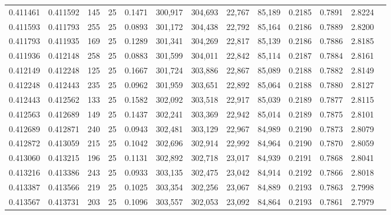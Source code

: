 \begin{tabular}{rrrrrrrrrrrrr}
0.411461 & 0.411592 &   145 &  25 &                                     0.1471 & 300,917 & 304,693 &  22,767 &  85,189 & 0.2185 & 0.7891 & 2.8224 \\
0.411593 & 0.411793 &   255 &  25 &                                     0.0893 & 301,172 & 304,438 &  22,792 &  85,164 & 0.2186 & 0.7889 & 2.8200 \\
0.411793 & 0.411935 &   169 &  25 &                                     0.1289 & 301,341 & 304,269 &  22,817 &  85,139 & 0.2186 & 0.7886 & 2.8185 \\
0.411936 & 0.412148 &   258 &  25 &                                     0.0883 & 301,599 & 304,011 &  22,842 &  85,114 & 0.2187 & 0.7884 & 2.8161 \\
0.412149 & 0.412248 &   125 &  25 &                                     0.1667 & 301,724 & 303,886 &  22,867 &  85,089 & 0.2188 & 0.7882 & 2.8149 \\
0.412248 & 0.412443 &   235 &  25 &                                     0.0962 & 301,959 & 303,651 &  22,892 &  85,064 & 0.2188 & 0.7880 & 2.8127 \\
0.412443 & 0.412562 &   133 &  25 &                                     0.1582 & 302,092 & 303,518 &  22,917 &  85,039 & 0.2189 & 0.7877 & 2.8115 \\
0.412563 & 0.412689 &   149 &  25 &                                     0.1437 & 302,241 & 303,369 &  22,942 &  85,014 & 0.2189 & 0.7875 & 2.8101 \\
0.412689 & 0.412871 &   240 &  25 &                                     0.0943 & 302,481 & 303,129 &  22,967 &  84,989 & 0.2190 & 0.7873 & 2.8079 \\
0.412872 & 0.413059 &   215 &  25 &                                     0.1042 & 302,696 & 302,914 &  22,992 &  84,964 & 0.2190 & 0.7870 & 2.8059 \\
0.413060 & 0.413215 &   196 &  25 &                                     0.1131 & 302,892 & 302,718 &  23,017 &  84,939 & 0.2191 & 0.7868 & 2.8041 \\
0.413216 & 0.413386 &   243 &  25 &                                     0.0933 & 303,135 & 302,475 &  23,042 &  84,914 & 0.2192 & 0.7866 & 2.8018 \\
0.413387 & 0.413566 &   219 &  25 &                                     0.1025 & 303,354 & 302,256 &  23,067 &  84,889 & 0.2193 & 0.7863 & 2.7998 \\
0.413567 & 0.413731 &   203 &  25 &                                     0.1096 & 303,557 & 302,053 &  23,092 &  84,864 & 0.2193 & 0.7861 & 2.7979 \\

\end{tabular}
